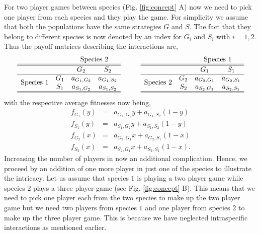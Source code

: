 \documentclass[aps,pre,amsfonts,floatfix, onecolumn,showkeys]{revtex4-1}
\begin{document}
For two player games between species (Fig. \ref{fig:concept} A)  now we need to pick one player from each species and they play the game.
For simplicity we assume that both the populations have the same strategies $G$ and $S$.
The fact that they belong to different species is now denoted by an index for $G_i$ and $S_i$ with $i = 1,2$.
Thus the payoff matrices describing the interactions
are,
\begin{equation}\label{}
\begin{array}{cccc}
& & \multicolumn{2}{c}{\text{Species 2}}\\
\hline\hline
&	&	G_2		&	S_2	\\
\hline
 \multirow{2}{*}{Species 1} & G_1 	& a_{G_1,G_2} &	a_{G_1,S_2} \\
&	S_1	&  a_{S_1,G_2} & a_{S_1,S_2} \\
 \hline\hline
\end{array}
\hspace{1cm}
\begin{array}{cccc}
& & \multicolumn{2}{c}{\text{Species 1}}\\
\hline\hline
&	&	G_1		&	S_1	\\
\hline
 \multirow{2}{*}{Species 2} & G_2 	& a_{G_2,G_1} &	a_{G_2,S_1} \\
&	S_2	&  a_{S_2,G_1} & a_{S_2,S_1} \nonumber \\
 \hline\hline
\end{array}
\end{equation}
with the respective average fitnesses now being,
\begin{eqnarray}
f_{G_1} (y) &=& a_{G_1,G_2} y + a_{G_1,S_2} (1-y) \nonumber \\
f_{S_1} (y) &=& a_{S_1,G_2} y + a_{S_1,S_2} (1-y)  \\
f_{G_2} (x) &=& a_{G_2,G_1} x + a_{G_2,S_1} (1-x)\nonumber \\
f_{S_2} (x) &=& a_{S_2,G_1} x + a_{S_2,S_1} (1-x).
\end{eqnarray}
Increasing the number of players in now an additional complication. 
Hence, we proceed by an addition of one more player in just one of the species to illustrate the intricacy.
Let us assume that species $1$ is playing a two player game while species $2$ plays a three player game (see Fig. \ref{fig:concept} B).
This means that we need to pick one player each from the two species to make up the two player game but we need two players from species $1$ and one player from species $2$ to make up the three player game.
This is because we have neglected intraspecific interactions as mentioned earlier.
\end{document}
